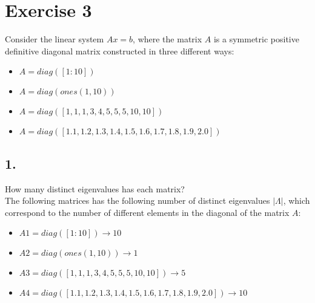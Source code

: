\documentclass[unicode,11pt,a4paper,oneside,numbers=endperiod,openany]{scrartcl}
\begin{document}

\clearpage

\section*{Exercise 3}

Consider the linear system $Ax = b$,
where the matrix $A$ is a symmetric positive definitive diagonal matrix
constructed in three different ways:

\begin{itemize}
    \item[ ] $A = diag([1:10])$
    \item[ ] $A = diag(ones(1,10))$
    \item[ ] $A = diag([1, 1, 1, 3, 4, 5, 5, 5, 10, 10])$
    \item[ ] $A = diag([1.1, 1.2, 1.3, 1.4, 1.5, 1.6, 1.7, 1.8, 1.9, 2.0])$
\end{itemize}

\subsection*{1.}
How many distinct eigenvalues has each matrix?\\

The following matrices has the following number of distinct eigenvalues $| \Lambda |$,
which correspond to the number of different elements in the diagonal of the matrix $A$:
\begin{itemize}
    \item[ ] $A1 = diag([1:10]) \rightarrow 10$
    \item[ ] $A2 = diag(ones(1,10)) \rightarrow 1$
    \item[ ] $A3 = diag([1, 1, 1, 3, 4, 5, 5, 5, 10, 10]) \rightarrow 5$
    \item[ ] $A4 = diag([1.1, 1.2, 1.3, 1.4, 1.5, 1.6, 1.7, 1.8, 1.9, 2.0]) \rightarrow 10$
\end{itemize}
\end{document}
